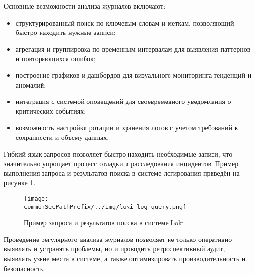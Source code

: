 Основные возможности анализа журналов включают:

\begin{itemize}
    \item структурированный поиск по ключевым словам и меткам, позволяющий быстро находить нужные записи;
    \item агрегация и группировка по временным интервалам для выявления паттернов и повторяющихся ошибок;
    \item построение графиков и дашбордов для визуального мониторинга тенденций и аномалий;
    \item интеграция с системой оповещений для своевременного уведомления о критических событиях;
    \item возможность настройки ротации и хранения логов с учетом требований к сохранности и объему данных.
\end{itemize}


Гибкий язык запросов позволяет быстро находить необходимые записи, что значительно упрощает процесс отладки и расследования инцидентов. Пример выполнения запроса и результатов поиска в системе логирования приведён на рисунке \ref{fig:loki_log_query}.

\begin{figure}[ht]
    \centering
    \texttt{[image: \\commonSecPathPrefix/../img/loki\_log\_query.png]}
    \caption{Пример запроса и результатов поиска в системе Loki}
    \label{fig:loki_log_query}
\end{figure}

Проведение регулярного анализа журналов позволяет не только оперативно выявлять и устранять проблемы, но и проводить ретроспективный аудит, выявлять узкие места в системе, а также оптимизировать производительность и безопасность.

